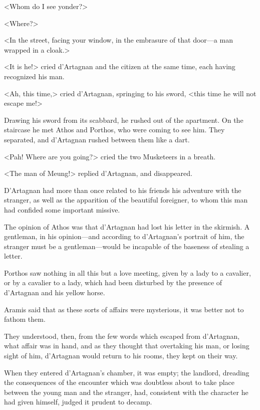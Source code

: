 <Whom do I see yonder?> 

<Where?> 

<In the street, facing your window, in the embrasure of that door---a man wrapped in a cloak.> 

<It is he!> cried d'Artagnan and the citizen at the same time, each having recognized his man. 

<Ah, this time,> cried d'Artagnan, springing to his sword, <this time he will not escape me!> 

Drawing his sword from its scabbard, he rushed out of the apartment. On the staircase he met Athos and Porthos, who were coming to see him. They separated, and d'Artagnan rushed between them like a dart. 

<Pah! Where are you going?> cried the two Musketeers in a breath. 

<The man of Meung!> replied d'Artagnan, and disappeared. 

D'Artagnan had more than once related to his friends his adventure with the stranger, as well as the apparition of the beautiful foreigner, to whom this man had confided some important missive. 

The opinion of Athos was that d'Artagnan had lost his letter in the skirmish. A gentleman, in his opinion---and according to d'Artagnan's portrait of him, the stranger must be a gentleman---would be incapable of the baseness of stealing a letter. 

Porthos saw nothing in all this but a love meeting, given by a lady to a cavalier, or by a cavalier to a lady, which had been disturbed by the presence of d'Artagnan and his yellow horse. 

Aramis said that as these sorts of affairs were mysterious, it was better not to fathom them. 

They understood, then, from the few words which escaped from d'Artagnan, what affair was in hand, and as they thought that overtaking his man, or losing sight of him, d'Artagnan would return to his rooms, they kept on their way. 

When they entered d'Artagnan's chamber, it was empty; the landlord, dreading the consequences of the encounter which was doubtless about to take place between the young man and the stranger, had, consistent with the character he had given himself, judged it prudent to decamp.